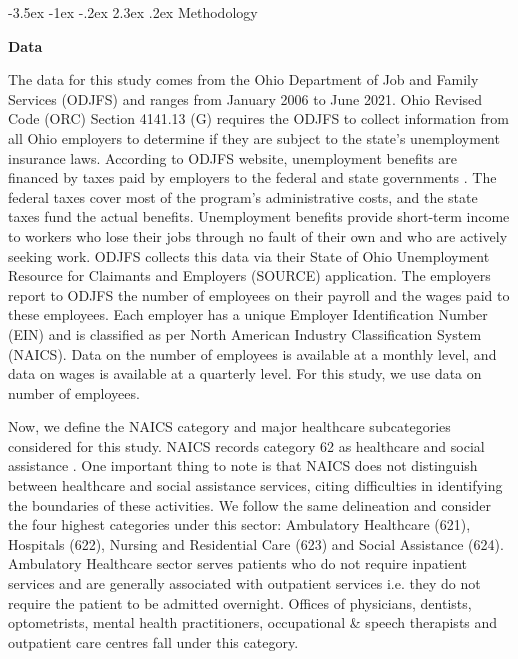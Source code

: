 \documentclass[11pt]{article}
\makeatletter
\renewcommand\section{\@startsection {section}{1}{\z@}%
                                       {-3.5ex \@plus -1ex \@minus -.2ex}%
                                       {2.3ex \@plus.2ex}%
                                       {\normalfont\fontfamily{phv}\fontsize{16}{19}\bfseries}}
\makeatother
\begin{document}
\section{Methodology} \label{s:methods}

{\bf Data}

\noindent
The data for this study comes from the Ohio Department of Job and Family Services (ODJFS) and ranges from January 2006 to June 2021. Ohio Revised Code (ORC) Section 4141.13 (G) requires the ODJFS to collect information from all Ohio employers to determine if they are subject to the state’s unemployment insurance laws. According to ODJFS website, unemployment benefits are financed by taxes paid by employers to the federal and state governments \cite{ui}. The federal taxes cover most of the program’s administrative costs, and the state taxes fund the actual benefits. Unemployment benefits provide short-term income to workers who lose their jobs through no fault of their own and who are actively seeking work. ODJFS collects this data via their State of Ohio Unemployment Resource for Claimants and Employers (SOURCE) application. The employers report to ODJFS the number of employees on their payroll and the wages paid to these employees. Each employer has a unique Employer Identification Number (EIN) and is classified as per North American Industry Classification System (NAICS). Data on the number of employees is available at a monthly level, and data on wages is available at a quarterly level. For this study, we use data on number of employees.

Now, we define the NAICS category and major healthcare subcategories considered for this study. NAICS records category 62 as healthcare and social assistance \cite{naicspdf}. One important thing to note is that NAICS does not distinguish between healthcare and social assistance services, citing difficulties in identifying the boundaries of these activities. We follow the same delineation and consider the four highest categories under this sector: Ambulatory Healthcare (621), Hospitals (622), Nursing and Residential Care (623) and Social Assistance (624).  
\\

Ambulatory Healthcare sector serves patients who do not require inpatient services and are generally associated with outpatient services i.e. they do not require the patient to be admitted overnight. Offices of physicians, dentists, optometrists, mental health practitioners, occupational \& speech therapists and outpatient care centres fall under this category.
\end{document}
